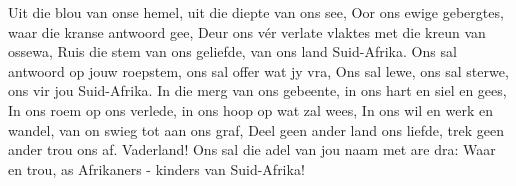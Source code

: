 \beginverse*
Uit die blou van onse hemel, uit die diepte van ons see,
Oor ons ewige gebergtes, waar die kranse antwoord gee,
Deur ons vér verlate vlaktes met die kreun van ossewa,
Ruis die stem van ons geliefde, van ons land Suid-Afrika.
Ons sal antwoord op jouw roepstem, ons sal offer wat jy vra,
Ons sal lewe, ons sal sterwe, ons vir jou Suid-Afrika.
\endverse
\beginverse*
In die merg van ons gebeente, in ons hart en siel en gees,
In ons roem op ons verlede, in ons hoop op wat zal wees,
In ons wil en werk en wandel, van on swieg tot aan ons graf,
Deel geen ander land ons liefde, trek geen ander trou ons af.
Vaderland! Ons sal die adel van jou naam met are dra:
Waar en trou, as Afrikaners - kinders van Suid-Afrika!
\endverse
\endsong 